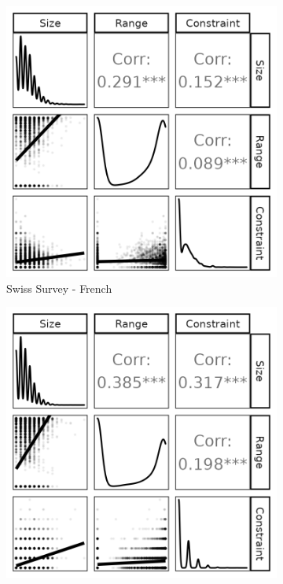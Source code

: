 \begin{figure}[h]
    \begin{subfigure}[h]{0.27\textwidth}
         \centering
         \includegraphics[width=\textwidth]{../fig/french_components.png}
         \caption{Swiss Survey - French}
    \end{subfigure}%
	\begin{subfigure}[h]{0.27\textwidth}
		\centering
		\includegraphics[width=\textwidth]{../fig/german_components.png}

\end{subfigure}
\end{figure}
